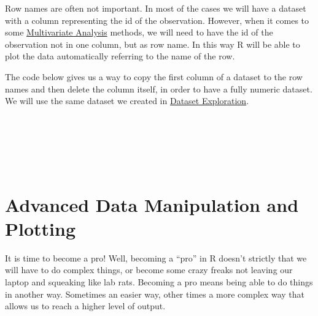 \documentclass[
]{article}
\newenvironment{Shaded}{\begin{snugshade}}{\end{snugshade}}
\newcommand{\AttributeTok}[1]{\textcolor[rgb]{0.13,0.29,0.53}{#1}}
\newcommand{\CommentTok}[1]{\textcolor[rgb]{0.56,0.35,0.01}{\textit{#1}}}
\newcommand{\DecValTok}[1]{\textcolor[rgb]{0.00,0.00,0.81}{#1}}
\newcommand{\FunctionTok}[1]{\textcolor[rgb]{0.13,0.29,0.53}{\textbf{#1}}}
\newcommand{\NormalTok}[1]{#1}
\newcommand{\OtherTok}[1]{\textcolor[rgb]{0.56,0.35,0.01}{#1}}
\newcommand{\SpecialCharTok}[1]{\textcolor[rgb]{0.81,0.36,0.00}{\textbf{#1}}}
\newcommand{\StringTok}[1]{\textcolor[rgb]{0.31,0.60,0.02}{#1}}
\begin{document}
Row names are often not important. In most of the cases we will have a
dataset with a column representing the id of the observation. However,
when it comes to some \protect\hyperlink{multivariate-analysis}{Multivariate Analysis} methods, we will need to
have the id of the observation not in one column, but as row name. In
this way R will be able to plot the data automatically referring to the
name of the row.

The code below gives us a way to copy the first column of a dataset to
the row names and then delete the column itself, in order to have a
fully numeric dataset. We will use the same dataset we created in
\protect\hyperlink{dataset-exploration}{Dataset Exploration}.

\begin{Shaded}
\end{Shaded}

~

~

~

\newpage

\hypertarget{advanced-data-manipulation-and-plotting}{%
\section{Advanced Data Manipulation and Plotting}\label{advanced-data-manipulation-and-plotting}}

It is time to become a pro! Well, becoming a ``pro'' in R doesn't strictly
that we will have to do complex things, or become some crazy freaks not
leaving our laptop and squeaking like lab rats. Becoming a pro means
being able to do things in another way. Sometimes an easier way, other
times a more complex way that allows us to reach a higher level of
output.
\end{document}

